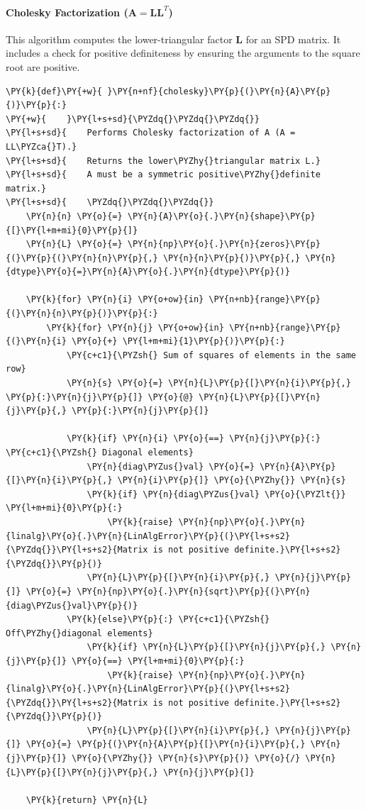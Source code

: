 \paragraph{Cholesky Factorization ($\mathbf{A} = \mathbf{L}\mathbf{L}^T$)}
This algorithm computes the lower-triangular factor $\mathbf{L}$ for an SPD matrix. It includes a check for positive definiteness by ensuring the arguments to the square root are positive.

\begin{Verbatim}[commandchars=\\\{\}]
\PY{k}{def}\PY{+w}{ }\PY{n+nf}{cholesky}\PY{p}{(}\PY{n}{A}\PY{p}{)}\PY{p}{:}
\PY{+w}{    }\PY{l+s+sd}{\PYZdq{}\PYZdq{}\PYZdq{}}
\PY{l+s+sd}{    Performs Cholesky factorization of A (A = LL\PYZca{}T).}
\PY{l+s+sd}{    Returns the lower\PYZhy{}triangular matrix L.}
\PY{l+s+sd}{    A must be a symmetric positive\PYZhy{}definite matrix.}
\PY{l+s+sd}{    \PYZdq{}\PYZdq{}\PYZdq{}}
    \PY{n}{n} \PY{o}{=} \PY{n}{A}\PY{o}{.}\PY{n}{shape}\PY{p}{[}\PY{l+m+mi}{0}\PY{p}{]}
    \PY{n}{L} \PY{o}{=} \PY{n}{np}\PY{o}{.}\PY{n}{zeros}\PY{p}{(}\PY{p}{(}\PY{n}{n}\PY{p}{,} \PY{n}{n}\PY{p}{)}\PY{p}{,} \PY{n}{dtype}\PY{o}{=}\PY{n}{A}\PY{o}{.}\PY{n}{dtype}\PY{p}{)}

    \PY{k}{for} \PY{n}{i} \PY{o+ow}{in} \PY{n+nb}{range}\PY{p}{(}\PY{n}{n}\PY{p}{)}\PY{p}{:}
        \PY{k}{for} \PY{n}{j} \PY{o+ow}{in} \PY{n+nb}{range}\PY{p}{(}\PY{n}{i} \PY{o}{+} \PY{l+m+mi}{1}\PY{p}{)}\PY{p}{:}
            \PY{c+c1}{\PYZsh{} Sum of squares of elements in the same row}
            \PY{n}{s} \PY{o}{=} \PY{n}{L}\PY{p}{[}\PY{n}{i}\PY{p}{,} \PY{p}{:}\PY{n}{j}\PY{p}{]} \PY{o}{@} \PY{n}{L}\PY{p}{[}\PY{n}{j}\PY{p}{,} \PY{p}{:}\PY{n}{j}\PY{p}{]}

            \PY{k}{if} \PY{n}{i} \PY{o}{==} \PY{n}{j}\PY{p}{:} \PY{c+c1}{\PYZsh{} Diagonal elements}
                \PY{n}{diag\PYZus{}val} \PY{o}{=} \PY{n}{A}\PY{p}{[}\PY{n}{i}\PY{p}{,} \PY{n}{i}\PY{p}{]} \PY{o}{\PYZhy{}} \PY{n}{s}
                \PY{k}{if} \PY{n}{diag\PYZus{}val} \PY{o}{\PYZlt{}} \PY{l+m+mi}{0}\PY{p}{:}
                    \PY{k}{raise} \PY{n}{np}\PY{o}{.}\PY{n}{linalg}\PY{o}{.}\PY{n}{LinAlgError}\PY{p}{(}\PY{l+s+s2}{\PYZdq{}}\PY{l+s+s2}{Matrix is not positive definite.}\PY{l+s+s2}{\PYZdq{}}\PY{p}{)}
                \PY{n}{L}\PY{p}{[}\PY{n}{i}\PY{p}{,} \PY{n}{j}\PY{p}{]} \PY{o}{=} \PY{n}{np}\PY{o}{.}\PY{n}{sqrt}\PY{p}{(}\PY{n}{diag\PYZus{}val}\PY{p}{)}
            \PY{k}{else}\PY{p}{:} \PY{c+c1}{\PYZsh{} Off\PYZhy{}diagonal elements}
                \PY{k}{if} \PY{n}{L}\PY{p}{[}\PY{n}{j}\PY{p}{,} \PY{n}{j}\PY{p}{]} \PY{o}{==} \PY{l+m+mi}{0}\PY{p}{:}
                    \PY{k}{raise} \PY{n}{np}\PY{o}{.}\PY{n}{linalg}\PY{o}{.}\PY{n}{LinAlgError}\PY{p}{(}\PY{l+s+s2}{\PYZdq{}}\PY{l+s+s2}{Matrix is not positive definite.}\PY{l+s+s2}{\PYZdq{}}\PY{p}{)}
                \PY{n}{L}\PY{p}{[}\PY{n}{i}\PY{p}{,} \PY{n}{j}\PY{p}{]} \PY{o}{=} \PY{p}{(}\PY{n}{A}\PY{p}{[}\PY{n}{i}\PY{p}{,} \PY{n}{j}\PY{p}{]} \PY{o}{\PYZhy{}} \PY{n}{s}\PY{p}{)} \PY{o}{/} \PY{n}{L}\PY{p}{[}\PY{n}{j}\PY{p}{,} \PY{n}{j}\PY{p}{]}

    \PY{k}{return} \PY{n}{L}
\end{Verbatim}

